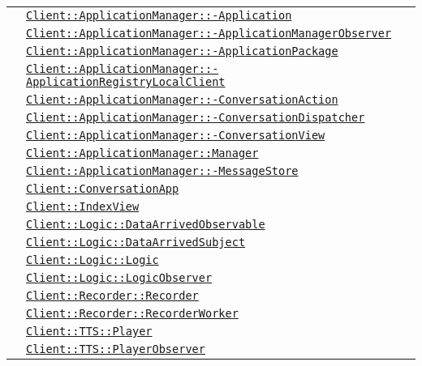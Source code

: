 \begin{longtable}{|>{\centering}m{3cm}|m{10cm}<{\centering}|}
& \hyperref[Client::ApplicationManager::Application]{\texttt{Client::ApplicationManager::-\linebreak Application}}\\
& \hyperref[Client::ApplicationManager::ApplicationManagerObserver]{\texttt{Client::ApplicationManager::-\linebreak ApplicationManagerObserver}}\\
& \hyperref[Client::ApplicationManager::ApplicationPackage]{\texttt{Client::ApplicationManager::-\linebreak ApplicationPackage}}\\
& \hyperref[Client::ApplicationManager::ApplicationRegistryLocalClient]{\texttt{Client::ApplicationManager::-\linebreak ApplicationRegistryLocalClient}}\\
& \hyperref[Client::ApplicationManager::ConversationAction]{\texttt{Client::ApplicationManager::-\linebreak ConversationAction}}\\
& \hyperref[Client::ApplicationManager::ConversationDispatcher]{\texttt{Client::ApplicationManager::-\linebreak ConversationDispatcher}}\\
& \hyperref[Client::ApplicationManager::ConversationView]{\texttt{Client::ApplicationManager::-\linebreak ConversationView}}\\
& \hyperref[Client::ApplicationManager::Manager]{\texttt{Client::ApplicationManager::Manager}}\\
& \hyperref[Client::ApplicationManager::MessageStore]{\texttt{Client::ApplicationManager::-\linebreak MessageStore}}\\
& \hyperref[Client::ConversationApp]{\texttt{Client::ConversationApp}}\\
& \hyperref[Client::IndexView]{\texttt{Client::IndexView}}\\
& \hyperref[Client::Logic::DataArrivedObservable]{\texttt{Client::Logic::DataArrivedObservable}}\\
& \hyperref[Client::Logic::DataArrivedSubject]{\texttt{Client::Logic::DataArrivedSubject}}\\
& \hyperref[Client::Logic::Logic]{\texttt{Client::Logic::Logic}}\\
& \hyperref[Client::Logic::LogicObserver]{\texttt{Client::Logic::LogicObserver}}\\
& \hyperref[Client::Recorder::Recorder]{\texttt{Client::Recorder::Recorder}}\\
& \hyperref[Client::Recorder::RecorderWorker]{\texttt{Client::Recorder::RecorderWorker}}\\
& \hyperref[Client::TTS::Player]{\texttt{Client::TTS::Player}}\\
& \hyperref[Client::TTS::PlayerObserver]{\texttt{Client::TTS::PlayerObserver}}\\ \hline


\end{longtable}
